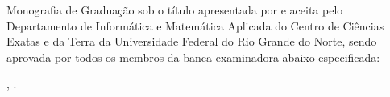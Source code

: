 \begin{folhadeaprovacao}
    \noindent Monografia de Graduação sob o título \textit{\thetitle} apresentada por \theauthor e aceita pelo Departamento de Informática e Matemática Aplicada do Centro de Ciências Exatas e da Terra da Universidade Federal do Rio Grande do Norte, sendo aprovada por todos os membros da banca examinadora abaixo especificada:
    
    \vfill
    
    \setlength{\ABNTEXsignthickness}{0.4pt}
    \setlength{\ABNTEXsignwidth}{10cm}
    \setlength{\ABNTEXsignskip}{2.5cm}
    
    
    
    
    
    \vfill
    
    \begin{center}
    \local, \approvaldate.
    \end{center}
\end{folhadeaprovacao}
